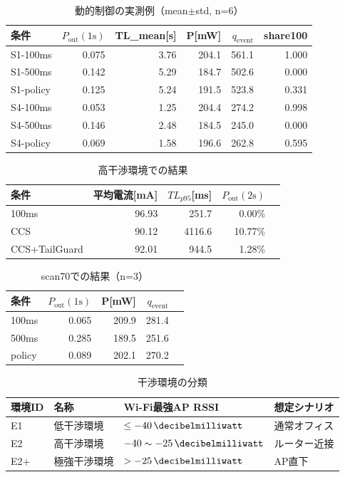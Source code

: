\documentclass[a4paper,12pt]{ltjsreport}
\begin{document}
\begin{table}[tb]
  \centering
  \caption{動的制御の実測例（mean$\pm$std, n=6）}
  \begin{tabular}{lrrrrr}
    \toprule
    条件 & $P_{\mathrm{out}}(1\mathrm{s})$ & TL\_mean[s] & P[mW] & $q_{\mathrm{event}}$ & share100 \\
    \midrule
    S1-100ms & 0.075 & 3.76 & 204.1 & 561.1 & 1.000 \\
    S1-500ms & 0.142 & 5.29 & 184.7 & 502.6 & 0.000 \\
    S1-policy & 0.125 & 5.24 & 191.5 & 523.8 & 0.331 \\
    S4-100ms & 0.053 & 1.25 & 204.4 & 274.2 & 0.998 \\
    S4-500ms & 0.146 & 2.48 & 184.5 & 245.0 & 0.000 \\
    S4-policy & 0.069 & 1.58 & 196.6 & 262.8 & 0.595 \\
    \bottomrule
  \end{tabular}
\end{table}
\clearpage
\clearpage
\begin{table}[tb]
  \centering
  \caption{高干渉環境での結果}
  \begin{tabular}{lrrrr}
    \toprule
    条件 & 平均電流[mA] & $TL_{p95}$[ms] & $P_{\mathrm{out}}(2\mathrm{s})$ \\
    \midrule
    100ms & 96.93 & 251.7 & 0.00\% \\
    CCS & 90.12 & 4116.6 & 10.77\% \\
    CCS+TailGuard & 92.01 & 944.5 & 1.28\% \\
    \bottomrule
  \end{tabular}
\end{table}
\clearpage
\clearpage
\begin{table}[tb]
  \centering
  \caption{scan70での結果（n=3）}
  \begin{tabular}{lrrrr}
    \toprule
    条件 & $P_{\mathrm{out}}(1\mathrm{s})$ & P[mW] & $q_{\mathrm{event}}$ \\
    \midrule
    100ms & 0.065 & 209.9 & 281.4 \\
    500ms & 0.285 & 189.5 & 251.6 \\
    policy & 0.089 & 202.1 & 270.2 \\
    \bottomrule
  \end{tabular}
\end{table}
\clearpage
\clearpage
\begin{table}[tb]
  \centering
  \caption{干渉環境の分類}
  \label{tab:env_interference}
  \begin{tabular}{llll}
    \toprule
    環境ID & 名称 & Wi-Fi最強AP RSSI & 想定シナリオ \\
    \midrule
    E1 & 低干渉環境 & $\le -40\,\si{\decibelmilliwatt}$ & 通常オフィス \\
    E2 & 高干渉環境 & $-40 \sim -25\,\si{\decibelmilliwatt}$ & ルーター近接 \\
    E2+ & 極強干渉環境 & $> -25\,\si{\decibelmilliwatt}$ & AP直下 \\
    \bottomrule
  \end{tabular}
\end{table}
\end{document}
